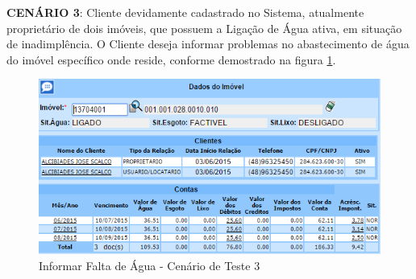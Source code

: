 \begin{flushleft}
\begin{description}
	\end{description}
	
	\begin{description}
		\item \textbf{CENÁRIO 3}: Cliente devidamente cadastrado no Sistema, atualmente proprietário de dois imóveis, que possuem a Ligação de Água ativa, em situação de inadimplência. O Cliente deseja informar problemas no abastecimento de água do imóvel específico onde reside, conforme demostrado na figura \ref{figura:informarFaltaAguaCenario3}.
		\begin{figure}[H]
			\centering
			\caption{Informar Falta de Água - Cenário de Teste 3}
			\label{figura:informarFaltaAguaCenario3}
			\includegraphics{figuras/cenarios/informar_falta_agua/cenario_3.PNG}
		\end{figure}
	\end{description}
\end{flushleft}	

